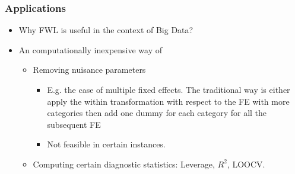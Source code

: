 \documentclass[
  shownotes,
  xcolor={svgnames},
  hyperref={colorlinks,citecolor=DarkBlue,linkcolor=DarkRed,urlcolor=DarkBlue}
  ]{beamer}
\begin{document}
\begin{frame}
\frametitle{Applications}

\begin{itemize}


  \item Why FWL is useful in the context of Big Data?
  \bigskip
  \item An computationally inexpensive way of
\begin{itemize}
  \medskip
  \item  Removing nuisance parameters
  \begin{itemize}
    \item E.g. the case of multiple fixed effects. The traditional way is either apply the within transformation with respect to the FE with more categories then add one dummy for each category for all the subsequent FE 
    \item Not feasible in certain instances. 
  \end{itemize}
  \medskip
  \item Computing certain diagnostic statistics: Leverage, $R^2$, LOOCV.

\end{itemize}

\end{itemize}

\end{frame}
\end{document}

